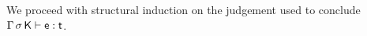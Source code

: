 \documentclass[acmlarge, anonymous, authordraft, review]{acmart} %
\begin{document}
We proceed with structural induction on the judgement used to conclude $\EnvType\Env\s\K\e\t$. 

% 
% 
\end{document}
